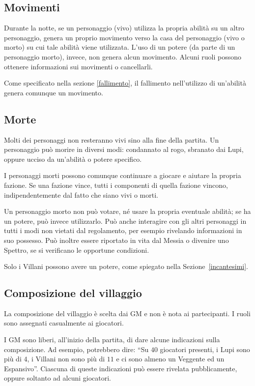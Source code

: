 \documentclass[a4paper,10pt]{article}
\begin{document}

\subsection{Movimenti}

Durante la notte, se un personaggio (vivo) utilizza la propria abilità su un altro personaggio, genera un proprio movimento verso la casa del personaggio (vivo o morto) su cui tale abilità viene utilizzata. L'uso di un potere (da parte di un personaggio morto), invece, non genera alcun movimento. Alcuni ruoli possono ottenere informazioni sui movimenti o cancellarli.

Come specificato nella sezione \ref{fallimento}, il fallimento nell'utilizzo di un'abilità genera comunque un movimento.

\subsection{Morte}

Molti dei personaggi non resteranno vivi sino alla fine della partita. Un personaggio può morire in diversi modi: condannato al rogo, sbranato dai Lupi, oppure ucciso da un'abilità o potere specifico.

I personaggi morti possono comunque continuare a giocare e aiutare la propria fazione. Se una fazione vince, tutti i componenti di quella fazione vincono, indipendentemente dal fatto che siano vivi o morti.

Un personaggio morto non può votare, né usare la propria eventuale abilità; se ha un potere, può invece utilizzarlo. Può anche interagire con gli altri personaggi in tutti i modi non vietati dal regolamento, per esempio rivelando informazioni in suo possesso. Può inoltre essere riportato in vita dal Messia o divenire uno Spettro, se si verificano le opportune condizioni.

Solo i Villani possono avere un potere, come spiegato nella Sezione~\ref{incantesimi}.

\subsection{Composizione del villaggio}
 
La composizione del villaggio è scelta dai GM e non è nota ai partecipanti. I ruoli sono assegnati casualmente ai giocatori.

I GM sono liberi, all'inizio della partita, di dare alcune indicazioni sulla composizione. Ad esempio, potrebbero dire: ``Su $40$ giocatori presenti, i Lupi sono più di $4$, i Villani non sono più di $11$ e ci sono almeno un Veggente ed un Espansivo''. Ciascuna di queste indicazioni può essere rivelata pubblicamente, oppure soltanto ad alcuni giocatori.
\end{document}
